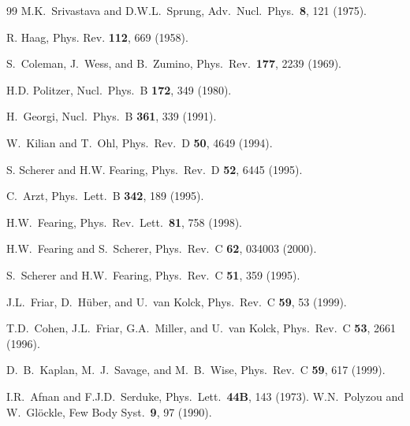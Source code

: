 \documentclass[aps,rmp,nofootinbib,twocolumn,floatfix]{revtex4}
\begin{document}
\begin{thebibliography}{99}
M.K.\ Srivastava and D.W.L.\ Sprung,
  Adv.\ Nucl.\ Phys.\ {\bf 8}, 121 (1975).
 
R. Haag, Phys. Rev. {\bf 112}, 669 (1958). 
 

S.~Coleman, J.~Wess, and B.~Zumino, Phys.\ Rev.\
    {\bf 177}, 2239 (1969).

H.D. Politzer, Nucl.\ Phys.\ B {\bf 172}, 349 (1980).

H.~Georgi, Nucl.\ Phys.\ B {\bf 361}, 339 (1991).

W.~Kilian and T.~Ohl, Phys.\ Rev.\ D {\bf 50}, 4649 (1994).

\bibitem{SCHERER95a}S. Scherer and H.W. Fearing, Phys.\ Rev.\ D {\bf 52},
6445 (1995).

C.~Arzt, Phys.\ Lett.\ B {\bf 342}, 189 (1995).

H.W.\ Fearing, Phys.\ Rev.\ Lett.\ {\bf 81}, 758 (1998).

H.W.\ Fearing and S.~Scherer, Phys.\ Rev.\ C {\bf 62},
034003 (2000).

S.\ Scherer and H.W.\ Fearing, Phys.\ Rev.\ C {\bf 51},
359 (1995).

J.L.\ Friar, D.\ H{\"u}ber, and U.\ van Kolck,
      Phys.\ Rev.\ C {\bf 59}, 53 (1999).

T.D.\ Cohen, J.L.\ Friar, G.A.\ Miller, and U.\ van Kolck,
      Phys.\ Rev.\ C {\bf 53}, 2661 (1996).

%
D.~B.\ Kaplan, M.~J.\ Savage, and M.~B.\ Wise,
        Phys.\ Rev.\ C {\bf 59}, 617 (1999).

I.R.\ Afnan and F.J.D.\ Serduke, Phys.\ Lett.\ {\bf 44B},
143 (1973).
%
W.N.\ Polyzou and W.~Gl\"ockle, Few Body Syst.\
 {\bf 9}, 97 (1990).


\end{thebibliography}
\end{document}

